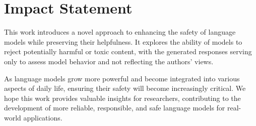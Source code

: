 \section*{Impact Statement}
This work introduces a novel approach to enhancing the safety of language models while preserving their helpfulness. It explores the ability of models to reject potentially harmful or toxic content, with the generated responses serving only to assess model behavior and not reflecting the authors' views.

As language models grow more powerful and become integrated into various aspects of daily life, ensuring their safety will become increasingly critical. We hope this work provides valuable insights for researchers, contributing to the development of more reliable, responsible, and safe language models for real-world applications.